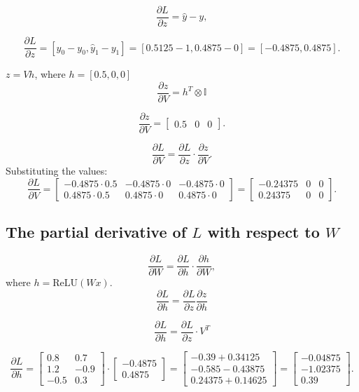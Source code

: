 \documentclass[12pt]{article}
\begin{document}
\[
\frac{\partial L}{\partial z} = \hat{y} - y,
\]

\[
\frac{\partial L}{\partial z} = [\hat{y}_0 - y_0, \hat{y}_1 - y_1] = [0.5125 - 1, 0.4875 - 0] = [-0.4875, 0.4875].
\]

                                                            \( z = Vh \), where \( h = [0.5, 0, 0] \)
\[
\frac{\partial z}{\partial V} = h^T\otimes \mathbb{I}
\]


\[
\frac{\partial z}{\partial V} = \begin{bmatrix}
    0.5 &0 &0 
\end{bmatrix}.
\]

\[
\frac{\partial L}{\partial V} = \frac{\partial L}{\partial z} \cdot \frac{\partial z}{\partial V}.
\]
Substituting the values:
\[
\frac{\partial L}{\partial V} =
\begin{bmatrix}
-0.4875 \cdot 0.5 & -0.4875 \cdot 0 & -0.4875 \cdot 0 \\
0.4875 \cdot 0.5 & 0.4875 \cdot 0 & 0.4875 \cdot 0
\end{bmatrix}
=
\begin{bmatrix}
-0.24375 & 0 & 0 \\
0.24375 & 0 & 0
\end{bmatrix}.
\]








\newpage


\subsection*{The partial derivative of \( L \) with respect to \(W \)}

\[
\frac{\partial L}{\partial W} = \frac{\partial L}{\partial h} \cdot \frac{\partial h}{\partial W},
\]
where \( h = \text{ReLU}(Wx) \).
\[\frac{\partial L}{\partial h} =\frac{\partial L}{\partial z}\frac{\partial z}{\partial h} \]

\[
\frac{\partial L}{\partial h} =  \frac{\partial L}{\partial z}\cdot V^T
\]

\[
\frac{\partial L}{\partial h} =
\begin{bmatrix}
0.8 & 0.7 \\
1.2 & -0.9 \\
-0.5 & 0.3
\end{bmatrix}
\cdot
\begin{bmatrix}
-0.4875 \\
0.4875
\end{bmatrix}
=
\begin{bmatrix}
-0.39 + 0.34125 \\
-0.585 - 0.43875 \\
0.24375 + 0.14625
\end{bmatrix}
=
\begin{bmatrix}
-0.04875 \\
-1.02375 \\
0.39
\end{bmatrix}.
\]
\end{document}
